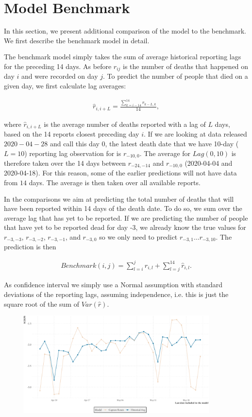 \section{Model Benchmark}
In this section, we present additional comparison of the model to the benchmark. We first describe the benchmark model in detail.

The benchmark model simply takes the sum of average historical reporting lags for the preceding 14 days. As before $r_{ij}$ is the number of deaths that happened on day $i$ and were recorded on day $j$. To predict the number of people that died on a given day, we first calculate lag averages:

\begin{align}
    \hat{r}_{i, i+L} = \frac{\sum^{14}_{k=i-14} r_{k - L, k}}{14},
\end{align}

where $\hat{r}_{i, i+L}$ is the average number of deaths reported with a lag of $L$ days, based on the 14 reports closest preceding day $i$. If we are looking at data released $2020-04-28$ and call this day 0, the latest death date that we have 10-day ($L=10$) reporting lag observation for is $r_{-10,0}$. The average for $Lag(0, 10)$ is therefore taken over the 14 days between $r_{-24,-14}$ and $r_{-10,0}$ (2020-04-04 and 2020-04-18). For this reason, some of the earlier predictions will not have data from $14$ days. The average is then taken over all available reports.

In the comparisons we aim at predicting the total number of deaths that will have been reported within 14 days of the death date. To do so, we sum over the average lag that has yet to be reported. If we are predicting the number of people that have yet to be reported dead for day -3, we already know the true values for $r_{-3,-3}$, $r_{-3,-2}$, $r_{-3,-1}$, and $r_{-3,0}$ so we only need to predict $r_{-3,1}\ldots r_{-3,10}$. The prediction is then

\begin{align}
    Benchmark(i, j) = \sum_{l=i}^{j} r_{i,l}+ \sum_{l = j}^{14} \hat{r}_{i, l}.
\end{align}

As confidence interval we simply use a Normal assumption with standard deviations of the reporting lags, assuming independence, i.e. this is just the square root of the sum of $Var(\hat{r})$.

\begin{figure}
    \centering
    \includegraphics[width=0.9\textwidth]{../plots/SCRPS_over_states}
    \caption{}
    \label{fig:SCRPS_states}
\end{figure}

